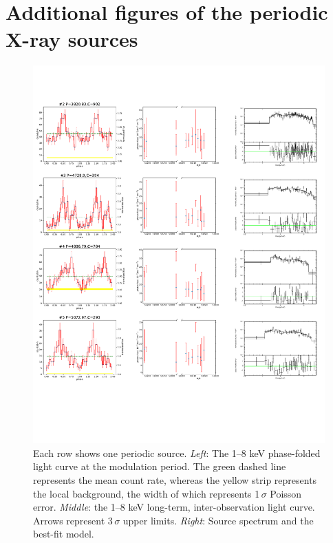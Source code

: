 \documentclass[fleqn,usenatbib]{mnras}
\begin{document}
\section{Additional figures of the periodic X-ray sources}\label{appen:fig}
  \begin{figure}
    \centering
    \includegraphics[page=1,scale=0.90,trim=0 100 0 20,clip]{plot_figure_LW.pdf}
    \caption{Each row shows one periodic source. {\it Left}: The 1--8 keV phase-folded light curve at the modulation period.
The green dashed line represents the mean count rate, whereas the yellow strip represents the local background, the width of which represents 1\,$\sigma$ Poisson error.
{\it Middle}: the 1--8 keV long-term, inter-observation light curve. Arrows represent 3\,$\sigma$ upper limits. 
{\it Right}: Source spectrum and the best-fit model. 
    \label{fig:Figure_p}}
  \end{figure}
  
\end{document}
